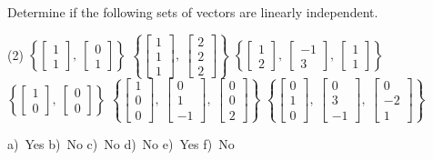 \begin{exercise}
Determine if the following sets of vectors are linearly independent.
\begin{tasks}(2)
\task $\displaystyle \left\{ \begin{bmatrix} 1 \\ 1 \end{bmatrix},\ \begin{bmatrix} 0 \\ 1 \end{bmatrix}\right\}$
\task $\displaystyle \left\{ \begin{bmatrix} 1 \\ 1 \\ 1 \end{bmatrix},\ \begin{bmatrix} 2 \\ 2 \\ 2 \end{bmatrix} \right\}$
\task $\displaystyle \left\{ \begin{bmatrix} 1 \\ 2 \end{bmatrix},\ \begin{bmatrix} -1 \\ 3 \end{bmatrix},\ \begin{bmatrix}  1 \\ 1 \end{bmatrix}\right\}$
\task $\displaystyle \left\{ \begin{bmatrix}  1 \\ 0 \end{bmatrix},\ \begin{bmatrix} 0 \\ 0 \end{bmatrix}\right\}$
\task $\displaystyle \left\{ \begin{bmatrix} 1 \\ 0 \\ 0 \end{bmatrix},\ \begin{bmatrix} 0 \\ 1 \\ -1 \end{bmatrix},\ \begin{bmatrix} 0 \\ 0 \\ 2 \end{bmatrix}\right\}$
\task $\displaystyle \left\{ \begin{bmatrix} 0 \\ 1 \\ 0 \end{bmatrix},\ \begin{bmatrix} 0 \\ 3 \\ -1 \end{bmatrix},\ \begin{bmatrix} 0 \\ -2 \\ 1 \end{bmatrix}\right\}$
\end{tasks}
\end{exercise}
\comboSol{%
}
{%
a)~Yes \quad b)~No \quad c)~No \quad d)~No \quad e)~Yes \quad f)~No
}


